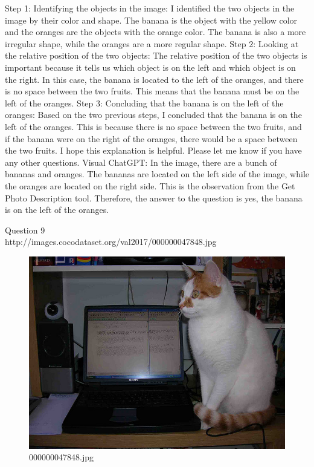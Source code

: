 \begin{enumerate}
        Step 1: Identifying the objects in the image: I identified the two objects in the image by their color and shape. The banana is the object with the yellow color and the oranges are the objects with the orange color. The banana is also a more irregular shape, while the oranges are a more regular shape.
        Step 2: Looking at the relative position of the two objects: The relative position of the two objects is important because it tells us which object is on the left and which object is on the right. In this case, the banana is located to the left of the oranges, and there is no space between the two fruits. This means that the banana must be on the left of the oranges.
        Step 3: Concluding that the banana is on the left of the oranges: Based on the two previous steps, I concluded that the banana is on the left of the oranges. This is because there is no space between the two fruits, and if the banana were on the right of the oranges, there would be a space between the two fruits.
        I hope this explanation is helpful. Please let me know if you have any other questions.
        \subitem Visual ChatGPT: In the image, there are a bunch of bananas and oranges. The bananas are located on the left side of the image, while the oranges are located on the right side. This is the observation from the Get Photo Description tool. Therefore, the answer to the question is yes, the banana is on the left of the oranges.
    \end{enumerate}
Question 9\\
http://images.cocodataset.org/val2017/000000047848.jpg
    \begin{figure}[h]
        \centering
        \includegraphics[width=0.8\linewidth]{../image set/easy/000000047848.jpg}
        \caption{000000047848.jpg}
    \end{figure}
